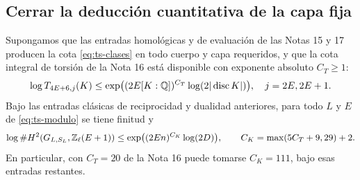 \subsection{Cerrar la deducción cuantitativa de la capa fija}

\begin{teorema}
\label{thm:ts-lemmaK}
Supongamos que las entradas homológicas y de evaluación de las Notas 15 y 17 producen la cota \eqref{eq:ts-clases} en todo cuerpo y capa requeridos, y que la cota integral de torsión de la Nota 16 está disponible con exponente absoluto $C_T\ge1$:
\begin{equation}
 \log T_{4E+6,j}(K)\le
 \exp\bigl((2E[K:\mathbb{Q}])^{C_T}\log(2|\operatorname{disc}K|)\bigr),
 \quad j=2E,2E+1.
 \label{eq:ts-tors}
\end{equation}
Bajo las entradas clásicas de reciprocidad y dualidad anteriores, para todo $L$ y $E$ de \eqref{eq:ts-modulo} se tiene finitud y
\begin{equation}
 \log\#H^2(G_{L,S_L},\mathbb{Z}_\ell(E+1))
 \le\exp\bigl((2En)^{C_K}\log(2D)\bigr),\qquad
 C_K=\max(5C_T+9,29)+2.
 \label{eq:ts-final}
\end{equation}
En particular, con $C_T=20$ de la Nota 16 puede tomarse $C_K=111$, bajo esas entradas restantes.
\end{teorema}
